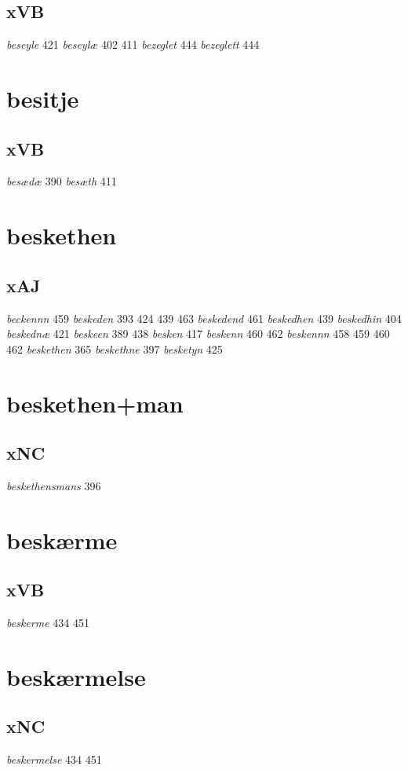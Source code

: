 \documentclass[a4paper,twocolumn]{article}
\begin{document}
\subsection{xVB}
\label{sec:org36de1fb}
\emph{beseyle} 421 \emph{beseylæ} 402 411 \emph{bezeglet} 444 \emph{bezeglett} 444 
\section{besitje}
\label{sec:orge7a78a8}
\subsection{xVB}
\label{sec:orgfc52f4e}
\emph{besædæ} 390 \emph{besæth} 411 
\section{beskethen}
\label{sec:org718cacb}
\subsection{xAJ}
\label{sec:orgc22e220}
\emph{beckennn} 459 \emph{beskeden} 393 424 439 463 \emph{beskedend} 461 \emph{beskedhen} 439 \emph{beskedhin} 404 \emph{beskednæ} 421 \emph{beskeen} 389 438 \emph{besken} 417 \emph{beskenn} 460 462 \emph{beskennn} 458 459 460 462 \emph{beskethen} 365 \emph{beskethne} 397 \emph{besketyn} 425 
\section{beskethen+man}
\label{sec:orge39e7a8}
\subsection{xNC}
\label{sec:org8ec697a}
\emph{beskethensmans} 396 
\section{beskærme}
\label{sec:org803670c}
\subsection{xVB}
\label{sec:org53832e3}
\emph{beskerme} 434 451 
\section{beskærmelse}
\label{sec:orgfc966ec}
\subsection{xNC}
\label{sec:orgef2e574}
\emph{beskermelse} 434 451 
\end{document}
